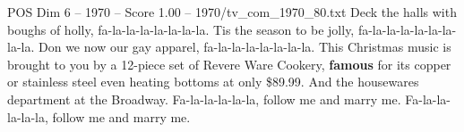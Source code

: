 \begin{textsample}{POS Dim 6 – 1970 – Score 1.00 – 1970/tv\_com\_1970\_80.txt}  \label{ex:f6_pos_040}
Deck the halls with boughs of holly, fa-la-la-la-la-la-la-la.
Tis the season to be jolly, fa-la-la-la-la-la-la-la-la.
Don we now our gay apparel, fa-la-la-la-la-la-la-la.
This Christmas music is brought to you by a 12-piece set of Revere Ware Cookery, \textbf{famous} for its copper or stainless steel even heating bottoms at only \$89.99.
And the housewares department at the Broadway.
Fa-la-la-la-la-la, follow me and marry me.
Fa-la-la-la-la-la, follow me and marry me.

\end{textsample}
